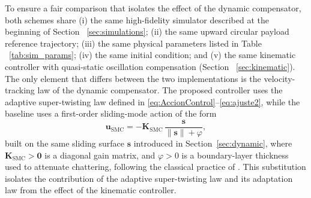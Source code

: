 \documentclass[sn-mathphys-num]{sn-jnl}
\theoremstyle{thmstyleone}%
\theoremstyle{thmstyletwo}%
\theoremstyle{thmstylethree}%
\begin{document}
To ensure a fair comparison that isolates the effect of the dynamic compensator, both schemes share (i) the same high-fidelity simulator described at the beginning of Section ~\ref{sec:simulations}; (ii) the same upward circular payload reference trajectory; (iii) the same physical parameters listed in Table ~\ref{tab:sim_params}; (iv) the same initial condition; and (v) the same kinematic controller with quasi-static oscillation compensation (Section ~\ref{sec:kinematic}). The only element that differs between the two implementations is the velocity-tracking law of the dynamic compensator. The proposed controller uses the adaptive super-twisting law defined in \eqref{eq:AccionControl}--\eqref{eq:ajuste2}, while the baseline uses a first-order sliding-mode action of the form
\begin{equation}
\mathbf{u}_{\mathrm{SMC}}
=
-\mathbf{K}_{\mathrm{SMC}}\,\dfrac{\mathbf{s}}{\|\mathbf{s}\|+\varphi},
\label{eq:smc_baseline}
\end{equation}
built on the same sliding surface $\mathbf{s}$ introduced in Section~\ref{sec:dynamic}, where $\mathbf{K}_{\mathrm{SMC}}\!>\!\mathbf{0}$ is a diagonal gain matrix, and $\varphi>0$ is a boundary-layer thickness used to attenuate chattering, following the classical practice of \cite{kusznir2020sliding}. This substitution isolates the contribution of the adaptive super-twisting law and its adaptation law from the effect of the kinematic controller.
\end{document}
